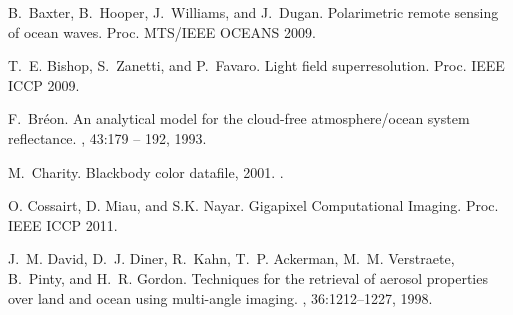 \documentclass[10pt,twocolumn,letterpaper]{article}
\begin{document}
{\small

  \begin{thebibliography}{10}\itemsep=-1pt

   B.~Baxter, B.~Hooper, J.~Williams, and J.~Dugan.
    \newblock Polarimetric remote sensing of ocean waves.  \newblock
    Proc. MTS/IEEE OCEANS 2009.

   T.~E. Bishop, S.~Zanetti, and P.~Favaro.  \newblock
    Light field superresolution.  Proc. IEEE ICCP 2009.

   F.~Br\'{e}on.  \newblock An analytical model for the
    cloud-free atmosphere/ocean system reflectance.  , 43:179 -- 192, 1993.


   M.~Charity.  \newblock Blackbody color
    datafile, 2001.  .


   O. Cossairt, D. Miau, and S.K. Nayar.  \newblock
    Gigapixel Computational Imaging.  \newblock Proc. IEEE ICCP 2011.

   J.~M. David, D.~J. Diner, R.~Kahn,
    T.~P. Ackerman, M.~M. Verstraete, B.~Pinty, and H.~R. Gordon.
    \newblock Techniques for the retrieval of aerosol properties over
    land and ocean using multi-angle imaging.  , 36:1212--1227, 1998.



\end{thebibliography}}
\end{document}
